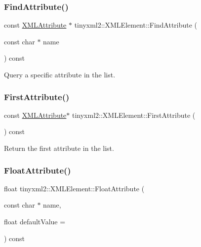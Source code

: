 \subsubsection{\texorpdfstring{Find\+Attribute()}{FindAttribute()}}
{\footnotesize\ttfamily const \mbox{\hyperlink{classtinyxml2_1_1_x_m_l_attribute}{X\+M\+L\+Attribute}} $\ast$ tinyxml2\+::\+X\+M\+L\+Element\+::\+Find\+Attribute (\begin{DoxyParamCaption}\item[{const char $\ast$}]{name }\end{DoxyParamCaption}) const}



Query a specific attribute in the list. 

\mbox{\label{classtinyxml2_1_1_x_m_l_element_a3e191704c8d499906ec11fe2f60c6686}} 
\subsubsection{\texorpdfstring{First\+Attribute()}{FirstAttribute()}}
{\footnotesize\ttfamily const \mbox{\hyperlink{classtinyxml2_1_1_x_m_l_attribute}{X\+M\+L\+Attribute}}$\ast$ tinyxml2\+::\+X\+M\+L\+Element\+::\+First\+Attribute (\begin{DoxyParamCaption}{ }\end{DoxyParamCaption}) const\hspace{0.3cm}{\ttfamily [inline]}}



Return the first attribute in the list. 

\mbox{\label{classtinyxml2_1_1_x_m_l_element_ab1f4be2332e27dc640e9b6abd01d64dd}} 
\subsubsection{\texorpdfstring{Float\+Attribute()}{FloatAttribute()}}
{\footnotesize\ttfamily float tinyxml2\+::\+X\+M\+L\+Element\+::\+Float\+Attribute (\begin{DoxyParamCaption}\item[{const char $\ast$}]{name,  }\item[{float}]{default\+Value = {} }\end{DoxyParamCaption}) const}



